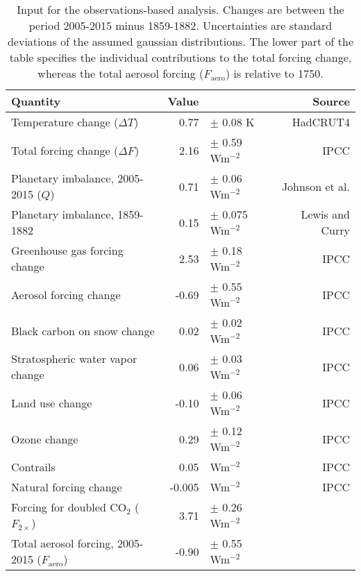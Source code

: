 \documentclass[12pt]{book}
\begin{document}
\begin{table}
  \caption{Input for the observations-based analysis. Changes are between the period 2005-2015 minus 1859-1882. Uncertainties are standard deviations of the assumed gaussian distributions. The lower part of the table specifies the individual contributions to the total forcing change, whereas the total aerosol forcing ($F_\textrm{aero}$) is relative to 1750. }
  \vspace{0.5 cm}
  \centering
  \begin{tabular}{lrlr}
    \hline
    Quantity & Value &  & Source\\
    \hline
    Temperature change ($\Delta T$)     & 0.77&$\pm$ 0.08 K                  & HadCRUT4\citep{Morice:2012dw} \\
    Total forcing change ($\Delta F$)      & 2.16&$\pm$ 0.59 Wm$^{-2}$   & IPCC\citep{IPCC:2013is} \\    
    Planetary imbalance, 2005-2015 ($Q$)            & 0.71&$\pm$ 0.06 Wm$^{-2}$   & Johnson et al.\citep{Johnson:2016do} \\
    Planetary imbalance, 1859-1882                      & 0.15&$\pm$ 0.075 Wm$^{-2}$ & Lewis and Curry\citep{Lewis:2014jt} \\    
    \hline
    Greenhouse gas forcing change   & 2.53&$\pm$ 0.18 Wm$^{-2}$   & IPCC\citep{IPCC:2013is} \\    
    Aerosol forcing change                  &-0.69&$\pm$ 0.55 Wm$^{-2}$   & IPCC\citep{IPCC:2013is} \\    
    Black carbon on snow change      & 0.02&$\pm$ 0.02 Wm$^{-2}$   & IPCC\citep{IPCC:2013is} \\     
    Stratospheric water vapor change& 0.06&$\pm$ 0.03 Wm$^{-2}$   & IPCC\citep{IPCC:2013is} \\        
    Land use change                          &-0.10&$\pm$ 0.06 Wm$^{-2}$   & IPCC\citep{IPCC:2013is} \\        
    Ozone change                              & 0.29&$\pm$ 0.12 Wm$^{-2}$   & IPCC\citep{IPCC:2013is} \\        
    Contrails                                        & 0.05& Wm$^{-2}$                     & IPCC\citep{IPCC:2013is} \\        
    Natural forcing change                  & -0.005 &  Wm$^{-2}$                & IPCC\citep{IPCC:2013is} \\         
    \hline
    Forcing for doubled CO$_2$ ($F_{2\times}$)           & 3.71&$\pm$ 0.26 Wm$^{-2}$   & \\        
    Total aerosol forcing, 2005-2015 ($F_\textrm{aero}$)  &-0.90&$\pm$ 0.55 Wm$^{-2}$   & \\      
    \hline
  \end{tabular}

  \label{table:input}
\end{table}
\end{document}
